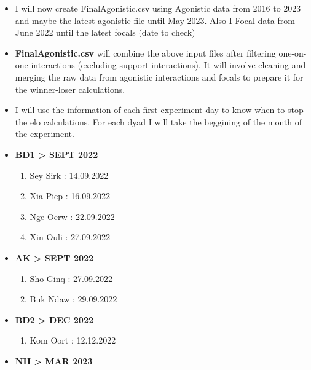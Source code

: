 \documentclass[
]{article}
\providecommand{\tightlist}{%
  \setlength{\itemsep}{0pt}\setlength{\parskip}{0pt}}
\begin{document}
\begin{itemize}
\item
  I will now create FinalAgonistic.csv using Agonistic data from 2016 to
  2023 and maybe the latest agonistic file until May 2023. Also I Focal
  data from June 2022 until the latest focals (date to check)
\item
  \textbf{FinalAgonistic.csv} will combine the above input files after
  filtering one-on-one interactions (excluding support interactions). It
  will involve cleaning and merging the raw data from agonistic
  interactions and focals to prepare it for the winner-loser
  calculations.
\item
  I will use the information of each first experiment day to know when
  to stop the elo calculations. For each dyad I will take the beggining
  of the month of the experiment.
\item
  \textbf{BD1 \textgreater{} SEPT 2022}

  \begin{enumerate}
  \def\labelenumi{\alph{enumi}.}
  \tightlist
  \item
    Sey Sirk : 14.09.2022
  \item
    Xia Piep : 16.09.2022
  \item
    Nge Oerw : 22.09.2022
  \item
    Xin Ouli : 27.09.2022
  \end{enumerate}
\item
  \textbf{AK \textgreater{} SEPT 2022}

  \begin{enumerate}
  \def\labelenumi{\alph{enumi}.}
  \setcounter{enumi}{4}
  \tightlist
  \item
    Sho Ginq : 27.09.2022
  \item
    Buk Ndaw : 29.09.2022
  \end{enumerate}
\item
  \textbf{BD2 \textgreater{} DEC 2022}

  \begin{enumerate}
  \def\labelenumi{\alph{enumi}.}
  \setcounter{enumi}{7}
  \tightlist
  \item
    Kom Oort : 12.12.2022
  \end{enumerate}
\item
  \textbf{NH \textgreater{} MAR 2023}


\end{itemize}
\end{document}
